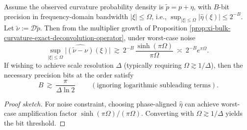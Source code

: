 \begin{corollary}\label{cor:xi-bulk-curvature-bit-complexity-lower-bound}
Assume the observed curvature probability density is \(\widetilde p=p+\eta\), with \(B\)-bit precision in frequency-domain bandwidth \(|\xi|\le \Omega\), i.e.,
\(
\sup_{|\xi|\le\Omega}|\widehat\eta(\xi)|\le 2^{-B}
\).
Let \(\widetilde\nu:=\mathcal D\widetilde p\).
Then from the multiplier growth of Proposition \ref{prop:xi-bulk-curvature-exact-deconvolution-operator}, under worst-case noise
\[
\sup_{|\xi|\le\Omega}\bigl|\widehat{(\widetilde\nu-\nu)}(\xi)\bigr|
\ \gtrsim\
2^{-B}\,\frac{\sinh(\pi\Omega)}{\pi\Omega}
\ \asymp\
2^{-B}e^{\pi\Omega}.
\]
If wishing to achieve scale resolution \(\Delta\) (typically requiring \(\Omega\gtrsim 1/\Delta\)), then the necessary precision bits at the order satisfy
\[
\boxed{\;B\ \gtrsim\ \frac{\pi}{\Delta\ln 2}\;}
\qquad(\text{ignoring logarithmic subleading terms}).
\]
\end{corollary}
\begin{proof}[Proof sketch]
For noise constraint, choosing phase-aligned \(\widehat\eta\) can achieve worst-case amplification factor \(\sinh(\pi\Omega)/(\pi\Omega)\).
Converting with \(\Omega\gtrsim 1/\Delta\) yields the bit threshold.
\end{proof}

